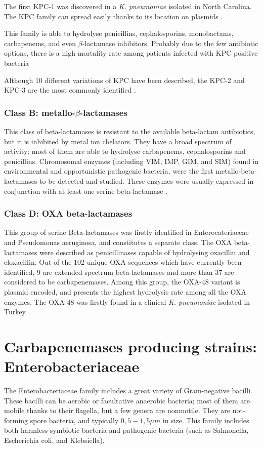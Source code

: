 \documentclass[11pt]{report}
\begin{document}
The first KPC-1 was discovered in a \emph{K. pneumoniae} isolated in North Carolina.
The KPC family can spread easily thanks to its location on plasmids \cite{Queenan2007}.

This family is able to hydrolyse penicillins, cephalosporins, monobactams, carbapenems, and even $\beta$-lactamase inhibitors.
Probably due to the few antibiotic options, there is a high mortality rate among patients infected with KPC positive bacteria \cite{MunozPrice2013}

Although 10 different variations of KPC have been described, the KPC-2 and KPC-3 are the most commonly identified \cite{WaltherRasmussen2007}.

\subsection {Class B: metallo-$\beta$-lactamases}
This class of beta-lactamases is resistant to the available beta-lactam antibiotics, but it is inhibited by metal ion chelators.
They have a broad spectrum of activity: most of them are able to hydrolyse carbapenems, cephalosporins and penicillins.
Chromosomal enzymes (including VIM, IMP, GIM, and SIM) found in environmental and opportunistic pathogenic bacteria, were the first metallo-beta-lactamases to be detected and studied.
These enzymes were usually expressed in conjunction with at least one serine beta-lactamase \cite{Queenan2007}.

\subsection{Class D: OXA beta-lactamases}
This group of serine Beta-lactamases was firstly identified in Enterocateriaceae and Pseudomonas aeruginosa, and constitutes a separate class.
The OXA beta-lactamases were described as penicillinases capable of hydrolysing oxacillin and cloxacillin.
Out of the 102 unique OXA sequences which have currently been identified, 9 are extended spectrum beta-lactamases and more than 37 are considered to be carbapenemases.
Among this group, the OXA-48 variant is plasmid encoded, and presents the highest hydrolysis rate among all the OXA enzymes.
The OXA-48 was firstly found in a clinical \emph{K. pneumoniae} isolated in Turkey \cite{Poirel2012}.

\chapter{Carbapenemases producing strains: Enterobacteriaceae}
The Enterobacteriaceae family includes a great variety of Gram-negative bacilli.
These bacilli can be aerobic or facultative anaerobic bacteria; most of them are mobile thanks to their flagella, but a few genera are nonmotile.
They are not-forming spore bacteria, and typically $0,5-1,5\mu m$ in size.
This family includes both harmless symbiotic bacteria and pathogenic bacteria (such as Salmonella, Escherichia coli, and Klebsiella).
\end{document}
